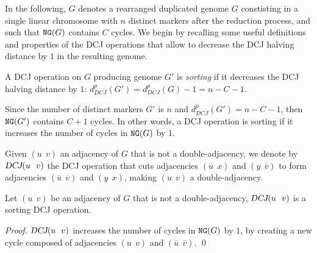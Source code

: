 \documentclass{llncs}
\newcommand{\fst}[1]{ \ensuremath{#1} }
\newcommand{\snd}[1]{ \ensuremath{\overline{#1}} }
\renewcommand{\NG}{\ensuremath{\mbox{\texttt{NG}}}}
\def\DCJ{\ensuremath{\mbox{\sl DCJ}}}
\begin{document}
In
the following, $G$ denotes a rearranged duplicated genome $G$
constisting in a single linear chromosome with $n$ distinct markers
after the reduction process, and such that $\NG(G)$ contains $C$ cycles.
We begin by recalling some useful definitions and properties of the DCJ
operations that allow to decrease the DCJ halving distance by $1$ in the resulting genome. 

\begin{definition}
A DCJ operation on $G$ producing genome $G'$ is \emph{sorting} if it decreases the DCJ halving distance by $1$: $d^p_{DCJ}(G') = d^p_{DCJ}(G)-1 = n-C-1$.
\end{definition}

Since the number of distinct markers $G'$ is $n$ and $d^p_{DCJ}(G') = n-C-1$, then $\NG(G')$ contains $C+1$ cycles. In other words, a DCJ operation is sorting if it increases the number of cycles in  $\NG(G)$ by $1$.

Given $(\fst{u}~~\fst{v})$ an adjacency of $G$ that is not a double-adjacency,
we denote by $\DCJ(\fst{u}~~\fst{v})$ the DCJ operation that cuts adjacencies $(\snd{u}~~\fst{x})$ and  $(\fst{y}~~\snd{v})$ to form adjacencies $(\snd{u}~~\snd{v})$ and  $(\fst{y}~~\fst{x})$, making $(\fst{u}~~\fst{v})$ a double-adjacency. 

\begin{property}
Let  $(\fst{u}~~\fst{v})$ be an adjacency of $G$ that is not a double-adjacency,
 $\DCJ(\fst{u}~~\fst{v})$ is a sorting DCJ operation.
\end{property}
\begin{proof}
$\DCJ(\fst{u}~~\fst{v})$ increases the number of cycles in  $\NG(G)$ by $1$, by creating a new cycle composed of adjacencies  $(\fst{u}~~\fst{v})$ and  $(\snd{u}~~\snd{v})$. \qed
\end{proof}

 
\end{document}
